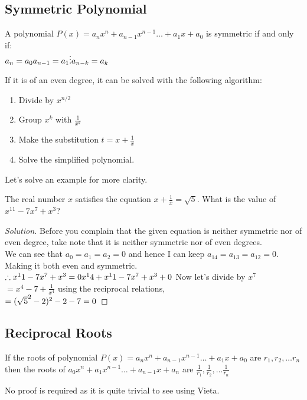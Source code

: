 \subsection{Symmetric Polynomial}
\begin{definition}
    A polynomial $P(x)=a_nx^n+a_{n-1}x^{n-1}\dots+a_1x+a_0$ is symmetric if and only if:\\
$a_n=a_0\\
a_{n-1}=a_1\\
\vdots\\
a_{n-k}=a_k$\\
\end{definition}
If it is of an even degree, it can be solved with the following algorithm:\\
\begin{theorem}
    [Algorithm]
    \begin{enumerate}
    \item Divide by $x^{n/2}$
    \item Group $x^k$ with $\frac{1}{x^k}$
    \item Make the substitution $t=x+\frac{1}{x}$
    \item Solve the simplified polynomial.
\end{enumerate}
\end{theorem}
Let's solve an example for more clarity.
\begin{example}
    The real number $x$ satisfies the equation $x+ \frac{1}{x} = \sqrt{5}$. What is the value of $x^11-7x^7+x^3$?
\end{example}
\begin{proof}
    [Solution]
    Before you complain that the given equation is neither symmetric nor of even degree, take note that it is neither symmetric nor of even degrees.\\
    We can see that $a_0 = a_1 = a_2=0$ and hence I can keep $a_14=a_13=a_12=0$. Making it both even and symmetric.\\
    $\therefore x^11-7x^7+x^3\\
    =0x^14+x^11-7x^7+x^3+0$ Now let's divide by $x^7$\\
    $=x^4-7+\frac{1}{x^4}$ using the reciprocal relations,\\
    $=(\sqrt{5}^2-2)^2-2-7\\
    =0$
\end{proof}
\subsection{Reciprocal Roots}
\begin{theorem}
    If the roots of polynomial $P(x)=a_nx^n+a_{n-1}x^{n-1}\dots+a_1x+a_0$ are $r_1,r_2,\dots r_n$ then the roots of $a_0x^n+a_1x^{n-1}\dots+a_{n-1}x+a_n$ are $\frac{1}{r_1}, \frac{1}{r_2}, \dots \frac{1}{r_n}$\\
\end{theorem}
No proof is required as it is quite trivial to see using Vieta.
